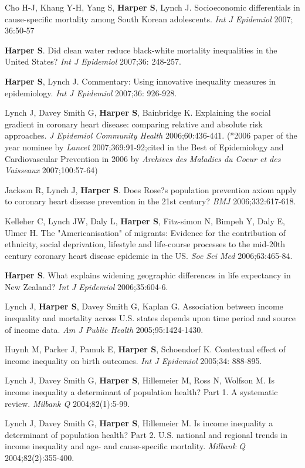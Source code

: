 \documentclass[
  letterpaper,
  DIV=11,
  numbers=noendperiod]{scrartcl}
\begin{document}
Cho H-J, Khang Y-H, Yang S, \textbf{Harper S}, Lynch J. Socioeconomic
differentials in cause-specific mortality among South Korean
adolescents. \emph{Int J Epidemiol} 2007; 36:50-57

\textbf{Harper S}. Did clean water reduce black-white mortality
inequalities in the United States? \emph{Int J Epidemiol} 2007;36:
248-257.

\textbf{Harper S}, Lynch J. Commentary: Using innovative inequality
measures in epidemiology. \emph{Int J Epidemiol} 2007;36: 926-928.

Lynch J, Davey Smith G, \textbf{Harper S}, Bainbridge K. Explaining the
social gradient in coronary heart disease: comparing relative and
absolute risk approaches. \emph{J Epidemiol Community Health}
2006;60:436-441. (*2006 paper of the year nominee by \emph{Lancet}
2007;369:91-92;cited in the Best of Epidemiology and Cardiovascular
Prevention in 2006 by \emph{Archives des Maladies du Coeur et des
Vaisseaux} 2007;100:57-64)

Jackson R, Lynch J, \textbf{Harper S}. Does Rose?s population prevention
axiom apply to coronary heart disease prevention in the 21st century?
\emph{BMJ} 2006;332:617-618.

Kelleher C, Lynch JW, Daly L, \textbf{Harper S}, Fitz-simon N, Bimpeh Y,
Daly E, Ulmer H. The "Americanisation" of migrants: Evidence for the
contribution of ethnicity, social deprivation, lifestyle and life-course
processes to the mid-20th century coronary heart disease epidemic in the
US. \emph{Soc Sci Med} 2006;63:465-84.

\textbf{Harper S}. What explains widening geographic differences in life
expectancy in New Zealand? \emph{Int J Epidemiol} 2006;35:604-6.

Lynch J, \textbf{Harper S}, Davey Smith G, Kaplan G. Association between
income inequality and mortality across U.S. states depends upon time
period and source of income data. \emph{Am J Public Health}
2005;95:1424-1430.

Huynh M, Parker J, Pamuk E, \textbf{Harper S}, Schoendorf K. Contextual
effect of income inequality on birth outcomes. \emph{Int J Epidemiol}
2005;34: 888-895.

Lynch J, Davey Smith G, \textbf{Harper S}, Hillemeier M, Ross N, Wolfson
M. Is income inequality a determinant of population health? Part 1. A
systematic review. \emph{Milbank Q} 2004;82(1):5-99.

Lynch J, Davey Smith G, \textbf{Harper S}, Hillemeier M. Is income
inequality a determinant of population health? Part 2. U.S. national and
regional trends in income inequality and age- and cause-specific
mortality. \emph{Milbank Q} 2004;82(2):355-400.
\end{document}

